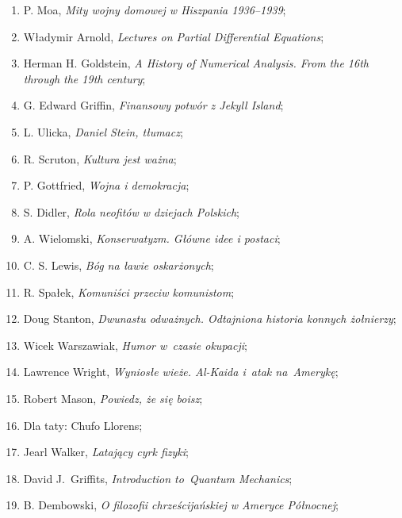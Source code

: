 \documentclass[a4paper,11pt]{article}
\begin{document}
\begin{enumerate}
\item P. Moa, \emph{Mity wojny domowej w Hiszpania 1936--1939};

\item Władymir Arnold, \emph{Lectures on Partial Differential
    Equations};

\item Herman H. Goldstein, \emph{A History of Numerical Analysis. From
    the 16th through the 19th century};

\item G. Edward Griffin, \emph{Finansowy potwór z Jekyll Island};

\item L. Ulicka, \emph{Daniel Stein, tłumacz};

\item R. Scruton, \emph{Kultura jest ważna};

\item P. Gottfried, \emph{Wojna i demokracja};

\item S. Didler, \emph{Rola neofitów w dziejach Polskich};

\item A. Wielomski, \emph{Konserwatyzm. Główne idee i postaci};

\item C. S. Lewis, \emph{Bóg na ławie oskarżonych};

\item R. Spałek, \emph{Komuniści przeciw komunistom};

\item Doug Stanton, \emph{Dwunastu odważnych. Odtajniona historia
    konnych żołnierzy};

\item Wicek Warszawiak, \emph{Humor w~czasie okupacji};

\item Lawrence Wright, \emph{Wyniosłe wieże. Al-Kaida i~atak
    na~Amerykę};

\item Robert Mason, \emph{Powiedz, że się boisz};

\item Dla taty: Chufo Llorens;

\item Jearl Walker, \emph{Latający cyrk fizyki};

\item David J.~Griffits, \emph{Introduction to~Quantum Mechanics};

\item B. Dembowski, \emph{O filozofii chrześcijańskiej w Ameryce
    Północnej};


\end{enumerate}
\end{document}
